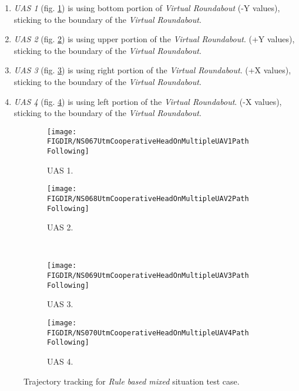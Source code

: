 \begin{enumerate}
	\item \emph{UAS 1} (fig. \ref{fig:ruleBasedMixedPathTrackingUAS1}) is using bottom portion of \emph{Virtual Roundabout} (-Y values), sticking to the boundary of the \emph{Virtual Roundabout}.
	
	\item \emph{UAS 2} (fig. \ref{fig:ruleBasedMixedPathTrackingUAS2}) is using upper portion of the \emph{Virtual Roundabout}. (+Y values), sticking to the boundary of the \emph{Virtual Roundabout}.
	
	\item \emph{UAS 3} (fig. \ref{fig:ruleBasedMixedPathTrackingUAS3}) is using right portion of the \emph{Virtual Roundabout}. (+X values), sticking to the boundary of the \emph{Virtual Roundabout}.
	
	\item \emph{UAS 4} (fig. \ref{fig:ruleBasedMixedPathTrackingUAS4}) is using left portion of the \emph{Virtual Roundabout}. (-X values), sticking to the boundary of the \emph{Virtual Roundabout}.
\end{enumerate}

\begin{figure}[H]
	\centering
	\begin{subfigure}{0.48\textwidth}
		\centering
		\texttt{[image: \\FIGDIR/NS067UtmCooperativeHeadOnMultipleUAV1PathFollowing]}
		\caption{UAS 1.}
		\label{fig:ruleBasedMixedPathTrackingUAS1}
	\end{subfigure}
	\begin{subfigure}{0.48\textwidth}
		\centering
		\texttt{[image: \\FIGDIR/NS068UtmCooperativeHeadOnMultipleUAV2PathFollowing]} 
		\caption{UAS 2.}
		\label{fig:ruleBasedMixedPathTrackingUAS2}
	\end{subfigure}
	\\
	\begin{subfigure}{0.48\textwidth}
		\centering
		\texttt{[image: \\FIGDIR/NS069UtmCooperativeHeadOnMultipleUAV3PathFollowing]} 
		\caption{UAS 3.}
		\label{fig:ruleBasedMixedPathTrackingUAS3}
	\end{subfigure}
	\begin{subfigure}{0.48\textwidth}
		\centering
		\texttt{[image: \\FIGDIR/NS070UtmCooperativeHeadOnMultipleUAV4PathFollowing]} 
		\caption{UAS 4.}
		\label{fig:ruleBasedMixedPathTrackingUAS4}
	\end{subfigure}
	\caption{Trajectory tracking for \emph{Rule based mixed} situation test case.}
	\label{fig:testCaseRuleBasedMixedTrajectoryTracking}
\end{figure}

